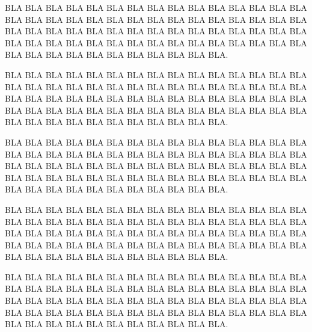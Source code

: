 \documentclass[]{classes/friggeri-letter}
\begin{document}
		BLA BLA BLA BLA BLA BLA BLA BLA BLA BLA BLA BLA BLA BLA BLA BLA BLA BLA BLA BLA BLA BLA BLA BLA BLA BLA BLA BLA BLA BLA BLA BLA BLA BLA BLA BLA BLA BLA BLA BLA BLA BLA BLA BLA BLA BLA BLA BLA BLA BLA BLA BLA BLA BLA BLA BLA BLA BLA BLA BLA BLA BLA BLA BLA BLA BLA BLA BLA BLA BLA BLA.

		BLA BLA BLA BLA BLA BLA BLA BLA BLA BLA BLA BLA BLA BLA BLA BLA BLA BLA BLA BLA BLA BLA BLA BLA BLA BLA BLA BLA BLA BLA BLA BLA BLA BLA BLA BLA BLA BLA BLA BLA BLA BLA BLA BLA BLA BLA BLA BLA BLA BLA BLA BLA BLA BLA BLA BLA BLA BLA BLA BLA BLA BLA BLA BLA BLA BLA BLA BLA BLA BLA BLA.

		BLA BLA BLA BLA BLA BLA BLA BLA BLA BLA BLA BLA BLA BLA BLA BLA BLA BLA BLA BLA BLA BLA BLA BLA BLA BLA BLA BLA BLA BLA BLA BLA BLA BLA BLA BLA BLA BLA BLA BLA BLA BLA BLA BLA BLA BLA BLA BLA BLA BLA BLA BLA BLA BLA BLA BLA BLA BLA BLA BLA BLA BLA BLA BLA BLA BLA BLA BLA BLA BLA BLA.

		BLA BLA BLA BLA BLA BLA BLA BLA BLA BLA BLA BLA BLA BLA BLA BLA BLA BLA BLA BLA BLA BLA BLA BLA BLA BLA BLA BLA BLA BLA BLA BLA BLA BLA BLA BLA BLA BLA BLA BLA BLA BLA BLA BLA BLA BLA BLA BLA BLA BLA BLA BLA BLA BLA BLA BLA BLA BLA BLA BLA BLA BLA BLA BLA BLA BLA BLA BLA BLA BLA BLA.

		BLA BLA BLA BLA BLA BLA BLA BLA BLA BLA BLA BLA BLA BLA BLA BLA BLA BLA BLA BLA BLA BLA BLA BLA BLA BLA BLA BLA BLA BLA BLA BLA BLA BLA BLA BLA BLA BLA BLA BLA BLA BLA BLA BLA BLA BLA BLA BLA BLA BLA BLA BLA BLA BLA BLA BLA BLA BLA BLA BLA BLA BLA BLA BLA BLA BLA BLA BLA BLA BLA BLA.

	\closing
	{}
	{\firstname\space\lastname}
\end{document}
